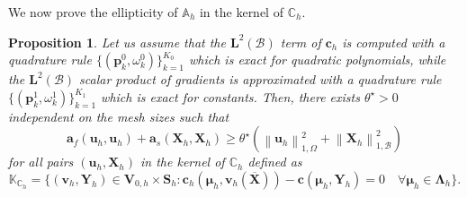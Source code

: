 \documentclass[oneside]{amsart} %
\newcommand{\numberset}{\mathbb}
\newcommand{\K}{\numberset{K}}
\newcommand{\A}{\numberset{A}}
\newcommand{\C}{\numberset{C}}
\newcommand{\norm}[1]{\left\lVert#1\right\rVert}
\newtheorem{prop}{Proposition}
\newcommand\LdBd{\mathbf{L}^2(\B)} %
\newcommand\B{\mathcal B} %
\renewcommand\u{\mathbf{u}} %
\renewcommand\a{\mathbf{a}} %
\renewcommand\v{\mathbf{v}} %
\renewcommand\c{\mathbf{c}} %
\renewcommand\S{\mathbf{S}} %
\newcommand\X{\mathbf{X}} %
\newcommand\Xbar{\overline{\X}} %
\newcommand\Y{\mathbf{Y}} %
\newcommand\LL{{\boldsymbol{\Lambda}}} %
\newcommand\Vline{\mathbf{V}} %
\newcommand\mmu{{\boldsymbol\mu}} %
\newcommand\quadnode{\mathbf{p}}
\newcommand\quadweigth{\omega}
\newcommand\Vdiv{\Vline_{0,h}} %
\begin{document}
	We now prove the ellipticity of $\A_h$ in the kernel of $\C_h$.
	
	\begin{prop} \label{prop:ellipticity} 
		Let us assume that the $\LdBd$ term of $\c_h$ is computed with a quadrature rule $\{(\quadnode_k^0,\quadweigth_k^0)\}_{k=1}^{K_0}$ which is exact for quadratic polynomials, while the $\LdBd$ scalar product of gradients is approximated with a quadrature rule $\{(\quadnode_k^1,\quadweigth_k^1)\}_{k=1}^{K_1}$ which is exact for constants.
		Then, there exists $\theta^\star>0$ independent on the mesh sizes such that
		\begin{equation}
			\a_f(\u_h,\u_h) + \a_s(\X_h,\X_h) \ge \theta^\star (\norm{\u_h}_{1,\Omega}^2 + \norm{\X_h}_{1,\B}^2)
		\end{equation}
		for all pairs $(\u_h,\X_h)$ in the kernel of $\C_h$ defined as
		\begin{equation}
			\K_{\C_h} = \{ (\v_h,\Y_h)\in\Vdiv\times\S_h:\c_h(\mmu_h,\v_h(\Xbar))-\c(\mmu_h,\Y_h)=0\quad\forall\mmu_h\in\LL_h\}.
		\end{equation}
	\end{prop}
	
\end{document}
